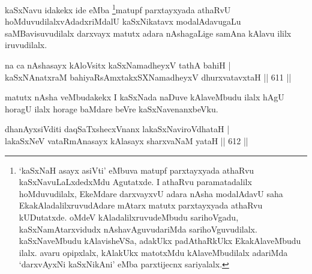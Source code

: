 \begin{artha}
kaSxNavu idakekx ide eMba \footnote{`kaSxNaH asayx asiVti' eMbuva matupf parxtayxyada athaRvu kaSxNavuLaLxdedxMdu Agutatxde. I athaRvu paramatadalilx hoMduvudilalx, EkeMdare darxvayxvU adara nAsha modalAdavU saha EkakAladalilxruvudAdare mAtarx matutx parxtayxyada athaRvu kUDutatxde. oMdeV kAladalilxruvudeMbudu sarihoVgadu, kaSxNamAtarxvidudx nAshavAguvudariMda sarihoVguvudilalx. kaSxNaveMbudu kAlavisheVSa, adakUkx padAthaRkUkx EkakAlaveMbudu ilalx. avaru opipxlalx, kAlakUkx matotxMdu kAlaveMbudilalx adariMda `darxvAyxNi kaSxNikAni' eMba parxtijecnx sariyalalx.}matupf parxtayxyada athaRvU hoMduvudilalxvAdadxriMdalU kaSxNikatavx modalAdavugaLu saMBavisuvudilalx darxvayx matutx adara nAshagaLige samAna kAlavu ililx iruvudilalx.
\end{artha}

\begin{shl}
\footnotemark[2]na ca nAshasayx kAloV\s sitx kaSxNamadheyxV tathA bahiH | \\
kaSxNAnatxraM bahiyaRsAmxtakxSXNamadheyxV dhurxvatavxtaH \hfill||  611 ||  
\end{shl}

\begin{artha}
matutx nAsha veMbudakekx I kaSxNada naDuve kAlaveMbudu ilalx hAgU horagU ilalx horage baMdare beVre kaSxNavenanxbeVku.
\end{artha}


\begin{shl}
dhanAyxsiVditi daqSaTxshecxVnanx lakaSxNaviroVdhataH | \\
\footnotemark[3]lakaSxNeV vataRmAnasayx kAlasayx sharxvaNaM yataH \hfill||  612 ||  
\end{shl}

